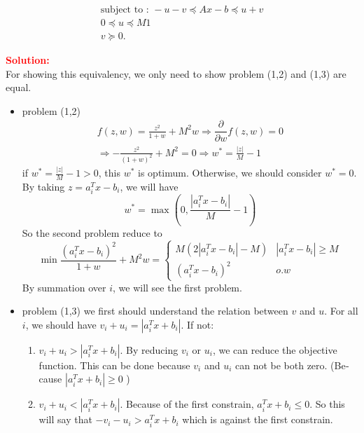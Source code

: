 \begin{latin}
\begin{enumerate}
\begin{gather*}
		\text{subject to : } -u - v \preceq Ax - b \preceq u + v
		\\
		0 \preceq u \preceq M1
		\\
		v \succeq 0.
	\end{gather*}
\end{enumerate}
\textcolor{red}{\textbf{Solution:}}
\\
For showing this equivalency, we only need to show problem (1,2) and (1,3) are equal.  
\\
\begin{itemize}
	\item problem (1,2)
\begin{gather*}
	f(z,w) = \frac{z^{2}}{1+w} + M^{2}w \Rightarrow \dfrac{\partial}{\partial w} f(z,w) = 0 
	\\
	\Rightarrow - \frac{z^{2}}{(1+w)^{2}} + M^{2} = 0 \Rightarrow w^{*} = \frac{|z|}{M} - 1
\end{gather*}
if $ w^{*} = \frac{|z|}{M} - 1 > 0 $, this $ w^{*} $ is optimum. Otherwise, we should consider $ w^{*} = 0 $. 
\\
By taking $ z = a_{i}^{T}x - b_{i} $, we will have 
\begin{equation*}
	w^{*} = \max (0, \frac{|a_{i}^{T}x - b_{i}|}{M} - 1)
\end{equation*}
So the second problem reduce to
\begin{equation*}
	\min \frac{(a_{i}^{T}x - b_{i})^{2}}{1+w} + M^{2}w = \begin{cases}
		M(2|a_{i}^{T}x - b_{i}|-M)  & |a_{i}^{T}x - b_{i}| \geq M 
		\\
		(a_{i}^{T}x - b_{i})^{2} & o.w
	\end{cases}
\end{equation*}
By summation over $ i $, we will see the first problem.
\item problem (1,3)
we first should understand the relation between $ v $ and $ u $. For all $ i $, we should have $ v_{i} + u_{i} = |a_{i}^{T}x+b_{i}|$.
If not: 
\begin{enumerate}
	\item $ v_{i} + u_{i} > |a_{i}^{T}x+b_{i}| $. By reducing $ v_{i} $ or $ u_{i} $, we can reduce the objective function. This can be done because $ v_{i} $ and $ u_{i} $ can not be both zero. (Because $ |a_{i}^{T}x+b_{i}| \geq 0$ )
	\item $ v_{i} + u_{i} < |a_{i}^{T}x+b_{i}| $. Because of the first constrain, $ a_{i}^{T}x+b_{i} \leq 0$. So this will say that $ - v_{i} - u_{i} > a_{i}^{T}x+b_{i} $ which is against the first constrain. 

\end{enumerate}
\end{itemize}
\end{latin}
